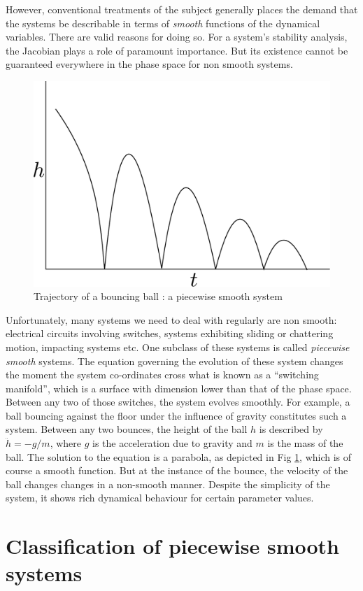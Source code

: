 \documentclass{book}
\renewcommand{\(}{\begin{columns}}
\renewcommand{\)}{\end{columns}}
\newcommand{\<}[1]{\begin{column}{#1}}
\renewcommand{\>}{\end{column}}
\begin{document}
However, conventional treatments of the subject generally places the demand 
that the systems be describable in terms of \emph{smooth} functions of the 
dynamical variables. There are valid reasons for doing so.  For a system's 
stability analysis, the Jacobian plays a role of paramount importance.  But 
its existence cannot be guaranteed everywhere in the phase space for non 
smooth systems.  

\begin{figure}
\label{fig-bouncing_ball}
\caption{Trajectory of a bouncing ball : a piecewise smooth system}
\begin{center}
\includegraphics[width=0.4\columnwidth]{bounce}
\end{center}
\end{figure}

Unfortunately, many systems we need to deal with regularly are non smooth: 
electrical circuits involving switches, systems exhibiting sliding or 
chattering motion, impacting systems etc.  One subclass of these systems is 
called  \emph{piecewise smooth} systems. The equation governing the evolution 
of these system changes the moment  the system 
co-ordinates cross what is known as a ``switching manifold'', which is a 
surface with 
dimension lower than that of the phase space.  Between any two of those 
switches, the system evolves smoothly. For example, a ball bouncing against 
the floor under the influence of gravity constitutes such a system.  Between 
any two bounces, the height of the ball $h$ is described by $\ddot{h}=-g/m$, 
where $g$ is the acceleration due to gravity and $m$ is the mass of the ball.  
The solution to the equation is a parabola, as depicted in Fig 
\ref{fig-bouncing_ball}, which is of course a smooth function.  But at the 
instance of the bounce, the velocity of the ball changes changes in a 
non-smooth manner.  Despite the simplicity of the system, it shows rich 
dynamical behaviour for certain parameter values\cite{2010arXiv1002.2448O}.  


\section{Classification of piecewise smooth systems}
\end{document}
